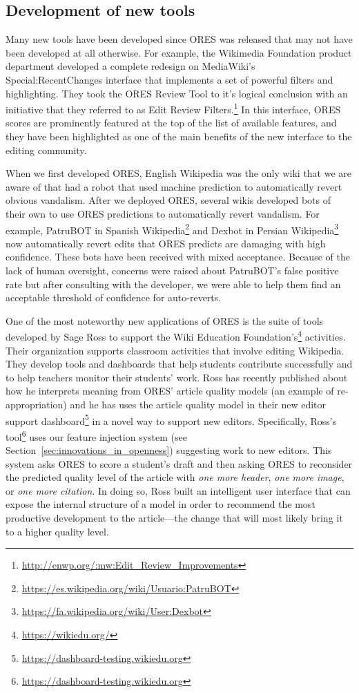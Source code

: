 \subsection{Development of new tools}
\label{sec:new_tools}
Many new tools have been developed since ORES was released that may not have been developed at all otherwise.  For example, the Wikimedia Foundation product department developed a complete redesign on MediaWiki's Special:RecentChanges interface that implements a set of powerful filters and highlighting.  They took the ORES Review Tool to it's logical conclusion with an initiative that they referred to as Edit Review Filters.\footnote{\url{http://enwp.org/:mw:Edit_Review_Improvements}}  In this interface, ORES scores are prominently featured at the top of the list of available features, and they have been highlighted as one of the main benefits of the new interface to the editing community.

When we first developed ORES, English Wikipedia was the only wiki that we are aware of that had a robot that used machine prediction to automatically revert obvious vandalism\cite{carter2008cluebot}.  After we deployed ORES, several wikis developed bots of their own to use ORES predictions to automatically revert vandalism.  For example, PatruBOT in Spanish Wikipedia\footnote{\url{https://es.wikipedia.org/wiki/Usuario:PatruBOT}} and Dexbot in Persian Wikipedia\footnote{\url{https://fa.wikipedia.org/wiki/User:Dexbot}} now automatically revert edits that ORES predicts are damaging with high confidence.  These bots have been received with mixed acceptance.  Because of the lack of human oversight, concerns were raised about PatruBOT's false positive rate but after consulting with the developer, we were able to help them find an acceptable threshold of confidence for auto-reverts.

One of the most noteworthy new applications of ORES is the suite of tools developed by Sage Ross to support the Wiki Education Foundation's\footnote{\url{https://wikiedu.org/}} activities.  Their organization supports classroom activities that involve editing Wikipedia.  They develop tools and dashboards that help students contribute successfully and to help teachers monitor their students' work.  Ross has recently published about how he interprets meaning from ORES' article quality models\cite{ross2016visualizing} (an example of re-appropriation) and he has uses the article quality model in their new editor support dashboard\footnote{\url{https://dashboard-testing.wikiedu.org}} in a novel way to support new editors.  Specifically, Ross's tool\footnote{\url{https://dashboard-testing.wikiedu.org}} uses our feature injection system (see Section~\ref{sec:innovations_in_openness}) suggesting work to new editors.  This system asks ORES to score a student's draft and then asking ORES to reconsider the predicted quality level of the article with \emph{one more header}, \emph{one more image}, or \emph{one more citation}. In doing so, Ross built an intelligent user interface that can expose the internal structure of a model in order to recommend the most productive development to the article---the change that will most likely bring it to a higher quality level.
